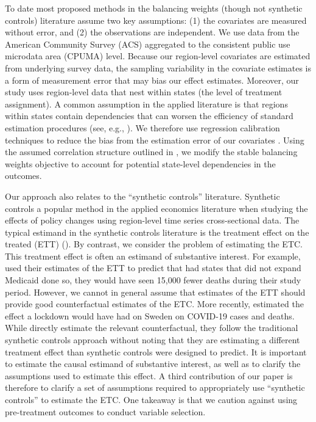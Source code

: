To date most proposed methods in the balancing weights (though not synthetic controls) literature assume two key assumptions: (1) the covariates are measured without error, and (2) the observations are independent. We use data from the American Community Survey (ACS) aggregated to the consistent public use microdata area (CPUMA) level. Because our region-level covariates are estimated from underlying survey data, the sampling variability in the covariate estimates is a form of measurement error that may bias our effect estimates. Moreover, our study uses region-level data that nest within states (the level of treatment assignment). A common assumption in the applied literature is that regions within states contain dependencies that can worsen the efficiency of standard estimation procedures (see, e.g., \cite{cameron2015practitioner}). We therefore use regression calibration techniques to reduce the bias from the estimation error of our covariates \cite{gleser1992importance}. Using the assumed correlation structure outlined in \cite{kloek1981ols}, we modify the stable balancing weights objective to account for potential state-level dependencies in the outcomes. 

Our approach also relates to the ``synthetic controls'' literature. Synthetic controls a popular method in the applied economics literature when studying the effects of policy changes using region-level time series cross-sectional data. The typical estimand in the synthetic controls literature is the treatment effect on the treated (ETT) (\cite{abadie2010synthetic}). By contrast, we consider the problem of estimating the ETC. This treatment effect is often an estimand of substantive interest. For example, \cite{miller2019medicaid} used their estimates of the ETT to predict that had states that did not expand Medicaid done so, they would have seen 15,000 fewer deaths during their study period. However, we cannot in general assume that estimates of the ETT should provide good counterfactual estimates of the ETC. More recently, \cite{born2020lockdowns} estimated the effect a lockdown would have had on Sweden on COVID-19 cases and deaths. While \cite{born2020lockdowns} directly estimate the relevant counterfactual, they follow the traditional synthetic controls approach without noting that they are estimating a different treatment effect than synthetic controls were designed to predict. It is important to estimate the causal estimand of substantive interest, as well as to clarify the assumptions used to estimate this effect. A third contribution of our paper is therefore to clarify a set of assumptions required to appropriately use ``synthetic controls'' to estimate the ETC. One takeaway is that we caution against using pre-treatment outcomes to conduct variable selection. 

